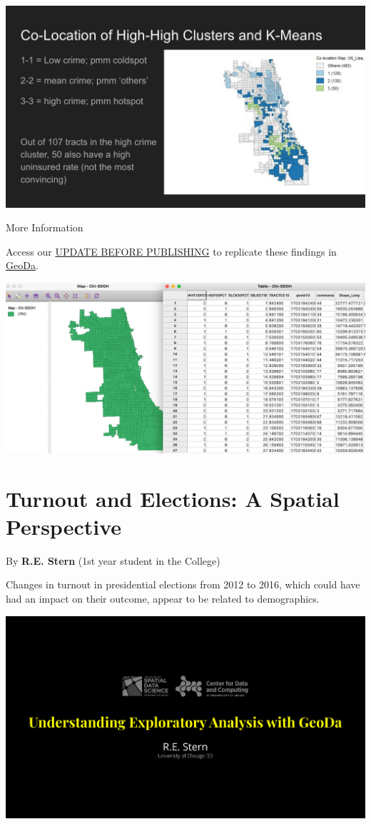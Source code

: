 \documentclass[
]{book}
\begin{document}
\includegraphics{images/health5.png}

More Information

Access our \href{https://geodacenter.github.io/data-and-lab/snow/}{UPDATE BEFORE PUBLISHING} to replicate these findings in \href{https://geodacenter.github.io}{GeoDa}.

\includegraphics{images/health6.jpg}

\hypertarget{turnout-and-elections-a-spatial-perspective}{%
\section{Turnout and Elections: A Spatial Perspective}\label{turnout-and-elections-a-spatial-perspective}}

By \textbf{R.E. Stern} (1st year student in the College)

Changes in turnout in presidential elections from 2012 to 2016, which could have had an impact on their outcome, appear to be related to demographics.

\includegraphics{images/elections1.png}
\end{document}
